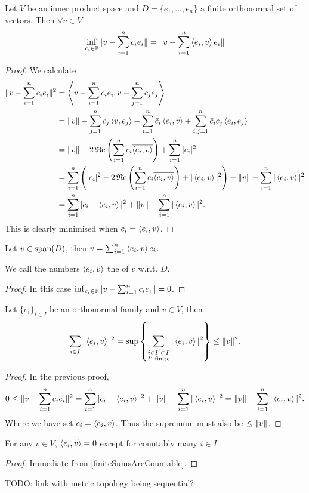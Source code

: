 \begin{proposition}
Let $V$ be an inner product space and $D = \{e_1,\ldots, e_n\}$ a finite orthonormal set of vectors. Then $\forall v\in V$
\[ \inf_{c_i\in\mathbb{F}}\lVert v-\sum_{i=1}^nc_ie_i\rVert = \lVert v-\sum_{i=1}^n\left\langle e_i,v \right\rangle e_i\rVert \]
\end{proposition}
\begin{proof}
We calculate
\begin{align*}
\lVert v-\sum_{i=1}^nc_ie_i\rVert^2 &= \left\langle v-\sum_{i=1}^nc_ie_i,v-\sum_{j=1}^nc_je_j \right\rangle \\
&= \lVert v\rVert - \sum_{j=1}^n c_j\left\langle v,e_j \right\rangle - \sum_{i=1}^n\bar{c}_i\left\langle e_i,v \right\rangle + \sum_{i,j=1}^n\bar{c}_ic_j\left\langle e_i,e_j \right\rangle \\
&= \lVert v\rVert - 2\operatorname{\mathfrak{R}e}\left(\sum_{i=1}^nc_i\overline{\left\langle e_i,v \right\rangle}\right) + \sum_{i=1}^n|c_i|^2 \\
&= \sum_{i=1}^n\left(|c_i|^2 - 2\operatorname{\mathfrak{R}e}\left(\sum_{i=1}^nc_i\overline{\left\langle e_i,v \right\rangle}\right) + |\left\langle e_i,v \right\rangle|^2\right) +\lVert v\rVert - \sum_{i=1}^n|\left\langle e_i;v \right\rangle|^2 \\
&= \sum_{i=1}^n|c_i - \left\langle e_i,v \right\rangle|^2 +\lVert v\rVert - \sum_{i=1}^n|\left\langle e_i,v \right\rangle|^2.
\end{align*}
This is clearly minimised when $c_i = \left\langle e_i,v \right\rangle$.
\end{proof}
\begin{corollary}
Let $v\in\operatorname{span}(D)$, then $v = \sum_{i=1}^n \left\langle e_i,v \right\rangle e_i$.
\end{corollary}
We call the numbers $\left\langle e_i,v \right\rangle$ the  of $v$ w.r.t. $D$.
\begin{proof}
In this case $\inf_{c_i\in\mathbb{F}}\lVert v-\sum_{i=1}^nc_ie_i\rVert = 0$.
\end{proof}
\begin{corollary} \label{BesselInequality}
Let $\{e_i\}_{i\in I}$ be an orthonormal family and $v\in V$, then
\[ \sum_{i\in I}|\left\langle e_i,v \right\rangle|^2 = \sup \left\{\sum_{\substack{i\in I' \subset I\\ I' \;\text{finite}}} |\left\langle e_i,v \right\rangle|^2 \right\} \leq \lVert v\rVert^2. \]
\end{corollary}
\begin{proof}
In the previous proof,
\[ 0 \leq \lVert v-\sum_{i=1}^nc_ie_i\rVert^2 = \sum_{i=1}^n|c_i - \left\langle e_i,v \right\rangle|^2 +\lVert v\rVert - \sum_{i=1}^n|\left\langle e_i,v \right\rangle|^2 = \lVert v\rVert - \sum_{i=1}^n|\left\langle e_i,v \right\rangle|^2. \]
Where we have set $c_i = \left\langle e_i,v \right\rangle$. Thus the supremum must also be $\leq \lVert v\rVert$.
\end{proof}
\begin{corollary}
For any $v\in V$, $\left\langle e_i,v \right\rangle = 0$ except for countably many $i\in I$. \label{countableComponents}
\end{corollary}
\begin{proof}
Immediate from \ref{finiteSumsAreCountable}.
\end{proof}
TODO: link with metric topology being sequential?

